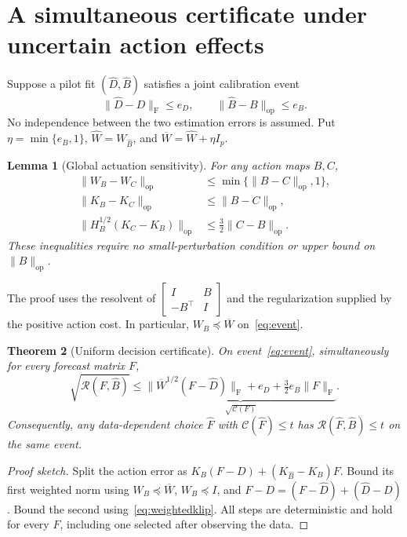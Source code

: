 \documentclass{article}
\newtheorem{theorem}{Theorem}
\newtheorem{lemma}[theorem]{Lemma}
\newcommand{\op}{\mathrm{op}}
\newcommand{\Reg}{\mathcal R}
\newcommand{\F}{\mathrm F}
\begin{document}
\section{A simultaneous certificate under uncertain action effects}
Suppose a pilot fit $(\widehat D,\widehat B)$ satisfies a joint calibration event
\begin{equation}\label{eq:event}
 \|\widehat D-D\|_\F\le e_D,\qquad
 \|\widehat B-B\|_\op\le e_B.
\end{equation}
No independence between the two estimation errors is assumed. Put $\eta=\min\{e_B,1\}$, $\widehat W=W_{\widehat B}$, and $\overline W=\widehat W+\eta I_p$.

\begin{lemma}[Global actuation sensitivity]\label{lem:lipschitz}
For any action maps $B,C$,
\begin{align}
 \|W_B-W_C\|_\op&\le\min\{\|B-C\|_\op,1\},\label{eq:wlip}\\
 \|K_B-K_C\|_\op&\le\|B-C\|_\op,\label{eq:klip}\\
 \|H_B^{1/2}(K_C-K_B)\|_\op&\le\tfrac32\|C-B\|_\op.\label{eq:weightedklip}
\end{align}
These inequalities require no small-perturbation condition or upper bound on $\|B\|_\op$.
\end{lemma}
The proof uses the resolvent of $\left[\begin{smallmatrix}I&B\\-B^\top&I\end{smallmatrix}\right]$ and the regularization supplied by the positive action cost. In particular, $W_B\preceq\overline W$ on~\eqref{eq:event}.

\begin{theorem}[Uniform decision certificate]\label{thm:certificate}
On event~\eqref{eq:event}, simultaneously for every forecast matrix $F$,
\begin{equation}\label{eq:certificate}
 \sqrt{\Reg(F,\widehat B)}\le
 \underbrace{\|\overline W^{1/2}(F-\widehat D)\|_\F
 +e_D+\tfrac32e_B\|F\|_\F}_{\displaystyle \sqrt{\mathcal C(F)}}.
\end{equation}
Consequently, any data-dependent choice $\widehat F$ with $\mathcal C(\widehat F)\le t$ has $\Reg(\widehat F,\widehat B)\le t$ on the same event.
\end{theorem}
\begin{proof}[Proof sketch]
Split the action error as $K_B(F-D)+(K_{\widehat B}-K_B)F$. Bound its first weighted norm using $W_B\preceq\overline W$, $W_B\preceq I$, and $F-D=(F-\widehat D)+(\widehat D-D)$. Bound the second using~\eqref{eq:weightedklip}. All steps are deterministic and hold for every $F$, including one selected after observing the data.
\end{proof}
\end{document}

